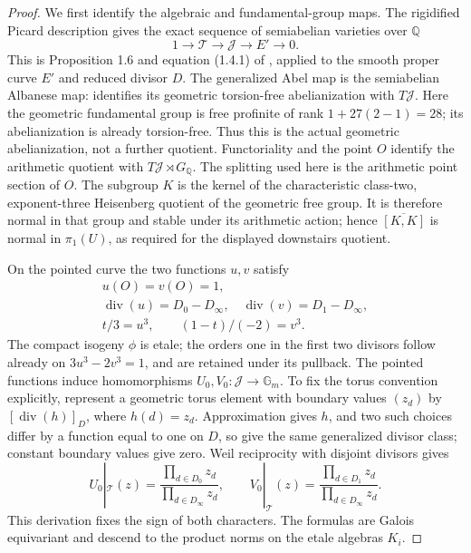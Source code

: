 \begin{proof}
We first identify the algebraic and fundamental-group
maps. The rigidified Picard description gives the exact
sequence of semiabelian varieties over \(\mathbb Q\)
\[
       1\longrightarrow\mathcal T
        \longrightarrow\mathcal J
        \longrightarrow E'\longrightarrow0.          \tag{28}
\]
This is Proposition 1.6 and equation (1.4.1) of
\cite{GhostJordanRibetScholl2024}, applied to the smooth
proper curve \(E'\) and reduced divisor \(D\).
The generalized Abel map is the semiabelian Albanese
map: \cite[Proposition A.8(ii),(iii)]{GhostMochizukiAlbanese2012}
identifies its geometric torsion-free abelianization
with \(T\mathcal J\). Here the geometric fundamental
group is free profinite of rank
\(1+27(2-1)=28\); its abelianization is already
torsion-free. Thus this is the actual geometric
abelianization, not a further quotient. Functoriality
and the point \(O\) identify the arithmetic quotient
with \(T\mathcal J\rtimes G_{\mathbb Q}\). The
splitting used here is the arithmetic point section
of \(O\). The subgroup \(K\) is the kernel of the
characteristic class-two, exponent-three Heisenberg
quotient of the geometric free group. It is therefore
normal in that group and stable under its arithmetic
action; hence \(\overline{[K,K]}\)
is normal in \(\pi_1(U)\), as required for the
displayed downstairs quotient.

On the pointed curve the two functions \(u,v\)
satisfy
\[
\begin{gathered}
 u(O)=v(O)=1,\\
 \operatorname{div}(u)=D_0-D_\infty,\quad
 \operatorname{div}(v)=D_1-D_\infty,\\
 t/3=u^3,\qquad (1-t)/(-2)=v^3.
\end{gathered}                                         \tag{29}
\]
The compact isogeny \(\phi\) is etale; the orders
one in the first two divisors follow already on
\(3u^3-2v^3=1\), and are retained under its pullback.
The pointed functions induce homomorphisms
\(U_0,V_0:\mathcal J\to\mathbb G_m\). To fix the
torus convention explicitly, represent a geometric
torus element with boundary values \((z_d)\) by
\([\operatorname{div}(h)]_D\), where
\(h(d)=z_d\). Approximation gives \(h\), and
two such choices differ by a function equal to one
on \(D\), so give the same generalized divisor
class; constant boundary values give zero. Weil
reciprocity with disjoint divisors gives
\[
 U_0|_{\mathcal T}(z)=
       \frac{\prod_{d\in D_0}z_d}{\prod_{d\in D_\infty}z_d},
 \qquad
 V_0|_{\mathcal T}(z)=
       \frac{\prod_{d\in D_1}z_d}{\prod_{d\in D_\infty}z_d}.
                                                        \tag{30}
\]
This derivation fixes the sign of both characters.
The formulas are Galois equivariant and descend to
the product norms on the etale algebras \(K_i\).


\end{proof}
